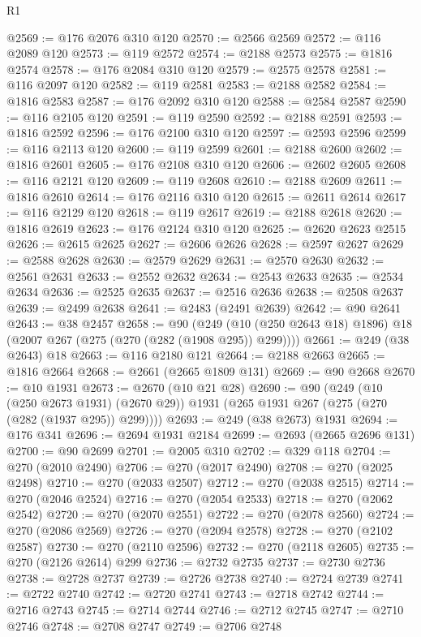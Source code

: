 \begin{lexlean}{R1}
\begin{coremodule}
@2569 := @176 @2076 @310 @120
@2570 := @2566 @2569
@2572 := @116 @2089 @120
@2573 := @119 @2572
@2574 := @2188 @2573
@2575 := @1816 @2574
@2578 := @176 @2084 @310 @120
@2579 := @2575 @2578
@2581 := @116 @2097 @120
@2582 := @119 @2581
@2583 := @2188 @2582
@2584 := @1816 @2583
@2587 := @176 @2092 @310 @120
@2588 := @2584 @2587
@2590 := @116 @2105 @120
@2591 := @119 @2590
@2592 := @2188 @2591
@2593 := @1816 @2592
@2596 := @176 @2100 @310 @120
@2597 := @2593 @2596
@2599 := @116 @2113 @120
@2600 := @119 @2599
@2601 := @2188 @2600
@2602 := @1816 @2601
@2605 := @176 @2108 @310 @120
@2606 := @2602 @2605
@2608 := @116 @2121 @120
@2609 := @119 @2608
@2610 := @2188 @2609
@2611 := @1816 @2610
@2614 := @176 @2116 @310 @120
@2615 := @2611 @2614
@2617 := @116 @2129 @120
@2618 := @119 @2617
@2619 := @2188 @2618
@2620 := @1816 @2619
@2623 := @176 @2124 @310 @120
@2625 := @2620 @2623 @2515
@2626 := @2615 @2625
@2627 := @2606 @2626
@2628 := @2597 @2627
@2629 := @2588 @2628
@2630 := @2579 @2629
@2631 := @2570 @2630
@2632 := @2561 @2631
@2633 := @2552 @2632
@2634 := @2543 @2633
@2635 := @2534 @2634
@2636 := @2525 @2635
@2637 := @2516 @2636
@2638 := @2508 @2637
@2639 := @2499 @2638
@2641 := @2483 (@2491 @2639)
@2642 := @90 @2641
@2643 := @38 @2457
@2658 := @90
    (@249 (@10 (@250 @2643 @18) @1896) @18 (@2007 @267 (@275 (@270 (@282 (@1908 @295)) @299))))
@2661 := @249 (@38 @2643) @18
@2663 := @116 @2180 @121
@2664 := @2188 @2663
@2665 := @1816 @2664
@2668 := @2661 (@2665 @1809 @131)
@2669 := @90 @2668
@2670 := @10 @1931
@2673 := @2670 (@10 @21 @28)
@2690 := @90
    (@249
      (@10 (@250 @2673 @1931) (@2670 @29))
      @1931
      (@265 @1931 @267 (@275 (@270 (@282 (@1937 @295)) @299))))
@2693 := @249 (@38 @2673) @1931
@2694 := @176 @341
@2696 := @2694 @1931 @2184
@2699 := @2693 (@2665 @2696 @131)
@2700 := @90 @2699
@2701 := @2005 @310
@2702 := @329 @118
@2704 := @270 (@2010 @2490)
@2706 := @270 (@2017 @2490)
@2708 := @270 (@2025 @2498)
@2710 := @270 (@2033 @2507)
@2712 := @270 (@2038 @2515)
@2714 := @270 (@2046 @2524)
@2716 := @270 (@2054 @2533)
@2718 := @270 (@2062 @2542)
@2720 := @270 (@2070 @2551)
@2722 := @270 (@2078 @2560)
@2724 := @270 (@2086 @2569)
@2726 := @270 (@2094 @2578)
@2728 := @270 (@2102 @2587)
@2730 := @270 (@2110 @2596)
@2732 := @270 (@2118 @2605)
@2735 := @270 (@2126 @2614) @299
@2736 := @2732 @2735
@2737 := @2730 @2736
@2738 := @2728 @2737
@2739 := @2726 @2738
@2740 := @2724 @2739
@2741 := @2722 @2740
@2742 := @2720 @2741
@2743 := @2718 @2742
@2744 := @2716 @2743
@2745 := @2714 @2744
@2746 := @2712 @2745
@2747 := @2710 @2746
@2748 := @2708 @2747
@2749 := @2706 @2748

\end{coremodule}
\end{lexlean}
